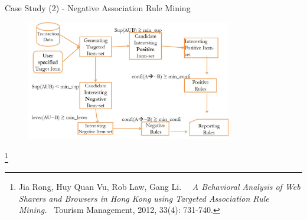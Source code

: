 \documentclass[
 size=14pt,
 paper=smartboard,  %
 mode=present, 		%
 display=slides, 	%
 style=tuliplab,  	%
 pauseslide,
 fleqn,leqno]{powerdot}
\begin{document}
\begin{slide}[toc=,bm=]{Case Study (2) - Negative Association Rule Mining}

\begin{figure}
	\includegraphics[width=0.8\textwidth]{figures//theme3//Theme3_2_1.eps}
\end{figure}

\footnote{Jia Rong, Huy Quan Vu, Rob Law, Gang Li.  
\emph{A Behavioral Analysis of Web Sharers and Browsers in Hong Kong using Targeted Association Rule Mining. }
Tourism Management, 2012, 33(4): 731-740.}

\end{slide}
\end{document}
